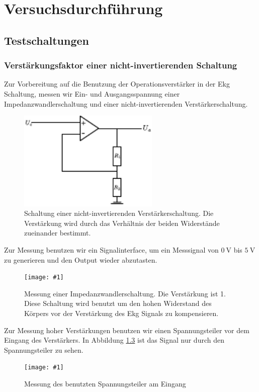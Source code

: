 \newcommand{\mess}[3] {
\begin{figure}[H]
	\centering
	\texttt{[image: \#1]}
	\caption{#2}
	\label{#3}
\end{figure} }
\newcommand{\refabb}[1]{(siehe Abb. \ref{#1})}

\chapter{Versuchsdurchführung}
\section{Testschaltungen}
\subsection{Verstärkungsfaktor einer nicht-invertierenden Schaltung}
Zur Vorbereitung auf die Benutzung der Operationsverstärker in der Ekg
Schaltung, messen wir Ein- und Ausgangsspannung einer Impedanzwandlerschaltung
und einer nicht-invertierenden Verstärkerschaltung.\\
\begin{figure}[htb]
    \centering
    \includegraphics[width=0.6\textwidth]{Abb/nicht-inv.pdf}
    \caption{Schaltung einer nicht-invertierenden Verstärkerschaltung. Die
Verstärkung wird durch das Verhältnis der beiden Widerstände zueinander
bestimmt.}
    \label{ninv}
\end{figure}

Zur Messung benutzen wir ein Signalinterface, um ein Messsignal von
$\SI{0}{\volt}$ bis $\SI{5}{\volt}$ zu generieren und den Output wieder
abzutasten. \\
\mess{Mess/Op/faktor1.pdf}{Messung einer Impedanzwandlerschaltung. Die
						   Verstärkung ist 1. Diese Schaltung wird benutzt um den hohen Widerstand des
						   Körpers vor der Verstärkung des Ekg Signals zu kompensieren.}{imp}

Zur Messung hoher Verstärkungen benutzen wir einen Spannungsteiler vor dem
Eingang des Verstärkers. In Abbildung \ref{spann} ist das Signal nur durch den
Spannungsteiler zu sehen.\\
\mess{Mess/Op/spannungsteiler.pdf}{Messung des benutzten Spannungsteiler am
Eingang}{spann}

